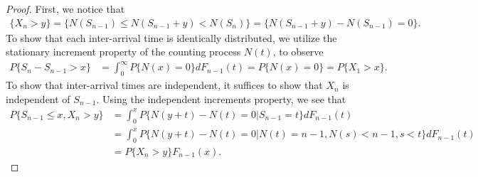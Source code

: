 \documentclass[a4paper,10pt,english]{article}
\begin{document}
\begin{proof} 
First, we notice that 
\begin{align*}
\{X_{n} > y\} = \{ N(S_{n-1}) \leqslant N(S_{n-1} + y) < N(S_{n})\} = \{N(S_{n-1}+y)-N(S_{n-1}) = 0\}. 
\end{align*}
To show that each inter-arrival time is identically distributed, we utilize the stationary increment property of the counting process $N(t)$, to observe 
\begin{align*}
P\{S_n - S_{n-1} > x\} &%
= \int_{0}^{\infty}P\{N(x) = 0\}dF_{n-1}(t) = P\{N(x) = 0\} = P\{X_1 > x\}.
\end{align*}
To show that inter-arrival times are independent, it suffices to show that $X_{n}$ is independent of $S_{n-1}$. 
Using the independent increments property, we see that 
\begin{align*}
P\{S_{n-1} \leqslant x, X_{n} > y\} &%
= \int_{0}^{x}P\{N(y+t) - N(t) = 0|S_{n-1} = t\}dF_{n-1}(t)\\
&= \int_{0}^{x}P\{N(y+t) - N(t) = 0|N(t) = n-1, N(s) < n-1, s < t \}dF_{n-1}(t) \\
&= P\{X_n > y\}F_{n-1}(x).
\end{align*}

\end{proof}
\end{document}

